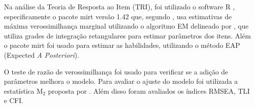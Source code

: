 Na análise da Teoria de Resposta ao Item (TRI), foi utilizado o software R \cite{r}, especificamente o pacote mirt \cite{mirt} versão 1.42 que, segundo , usa estimativas de máxima verossimilhança marginal utilizando o algoritmo EM delineado por , que utiliza grades de integração retangulares para estimar parâmetros dos itens. Além o pacote mirt foi usado para estimar as habilidades, utilizando o método EAP (Expected\textit{ A Posteriori}).

O teste de razão de verossimilhança foi usado para verificar se a adição de parâmetros melhora o modelo. Para avaliar o ajuste do modelo foi utilizada a estatística M$_2$ proposta por . Além disso foram avaliados os índices RMSEA, TLI e CFI.

\begin{comment}
	Inicialmente, foram ajustados modelos de 1, 2 e 3 parâmetros logísticos para os itens do teste, visando avaliar a qualidade dos itens e a adequação dos modelos aos dados. O modelo de 1 parâmetro (1PL) estima apenas a dificuldade dos itens, enquanto o modelo de 2 parâmetros (2PL) incorpora a discriminação, e o modelo de 3 parâmetros (3PL) adiciona o parâmetro de acerto casual.

	Outro método método para avaliar o modelo são os índices TLI  (\textit{Tucker–Lewis Index}) e CFI (\textit{Comparative Fit Index}), TLI significa Índice Tucker-Lewis e CFI significa Índice de Ajuste Comparativo. O TLI  compara o modelo estimado com um modelo teórico nulo e visa determinar se todos os indicadores são
	associados a um único fator latente, o CFI é um indicador adicional que serve para comparar modelos alternativos \cite{boruchovitch2017dark}. Ambos os indicadores indicam modelos com bom ajustes quando seu valor próximos de 1 \cite{hair2009multivariada}). 


\citeonline{timothy2015} considera o ajuste adequado quando o RMSEA é menor que 0,05. Quanto ao CFI e TLI, os onde valores acima de 0,90 sugerem um ajuste aceitável, e valores acima de 0,95 são considerados indicativos de um excelente ajuste.


---------------------------

Para verificar a adequação do melhor modelo, TLI e CFI são dois índices de ajuste usados na teoria de resposta ao item para avaliar o ajuste do modelo aos dados \cite{alvarenga2020item}.

 TLI significa Índice Tucker-Lewis e CFI significa Índice de Ajuste Comparativo. Esses índices de ajuste fornecem informações sobre o quão bem o modelo se ajusta às respostas dos itens observados. O TLI compara o ajuste do modelo especificado com um modelo nulo, enquanto o CFI compara o ajuste do modelo especificado com um modelo de linha de base. Valores mais altos de TLI e CFI indicam melhor ajuste entre o modelo e os dados. Esses índices de ajuste são aplicados no IRT para avaliar a adequação do modelo em representar a relação entre a característica latente e as respostas dos itens observados. 



\end{comment}
